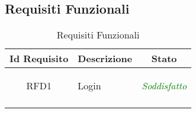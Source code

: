 \subsection{Requisiti Funzionali}
\normalsize
\begin{longtable}{|c|>{\centering}m{7cm}|c|}
\hline 
\textbf{Id Requisito} & \textbf{Descrizione} & \textbf{Stato}\\
\hline
\endhead
\hypertarget{RFD1}{RFD1} & Login & \textcolor{Green}{\textit{Soddisfatto}}\\ \hline

\caption[Requisiti Funzionali]{Requisiti Funzionali}
\label{tabella:req0}
\end{longtable}
\clearpage
